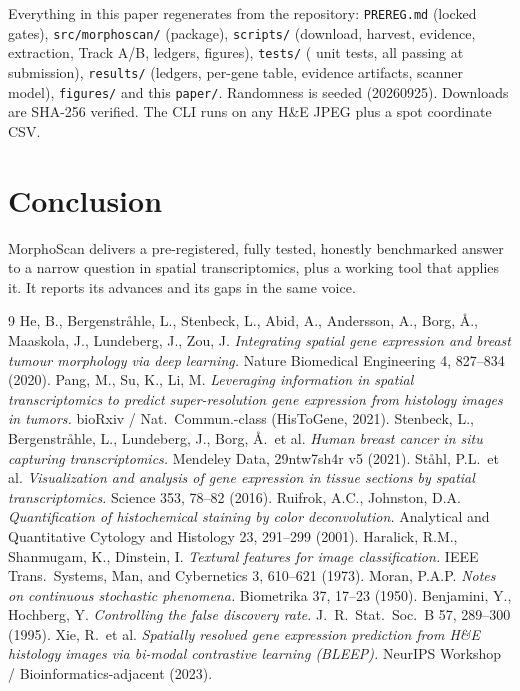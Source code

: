 \documentclass[11pt]{article}
\begin{document}
Everything in this paper regenerates from the repository: \texttt{PREREG.md} (locked
gates), \texttt{src/morphoscan/} (package), \texttt{scripts/} (download, harvest,
evidence, extraction, Track A/B, ledgers, figures), \texttt{tests/} (\numTests{}
unit tests, all passing at submission), \texttt{results/} (ledgers, per-gene table,
evidence artifacts, scanner model), \texttt{figures/} and this \texttt{paper/}.
Randomness is seeded (20260925). Downloads are SHA-256 verified. The CLI runs on any
H\&E JPEG plus a spot coordinate CSV.

\section{Conclusion}
MorphoScan delivers a pre-registered, fully tested, honestly benchmarked answer to a
narrow question in spatial transcriptomics, plus a working tool that applies it. It
reports its advances and its gaps in the same voice.

\begin{thebibliography}{9}\small
{} He, B., Bergenstr\r{a}hle, L., Stenbeck, L., Abid, A., Andersson, A.,
Borg, \AA., Maaskola, J., Lundeberg, J., Zou, J. \emph{Integrating spatial gene
expression and breast tumour morphology via deep learning.} Nature Biomedical
Engineering 4, 827--834 (2020).
 Pang, M., Su, K., Li, M. \emph{Leveraging information in spatial
transcriptomics to predict super-resolution gene expression from histology images in
tumors.} bioRxiv / Nat.\ Commun.-class (HisToGene, 2021).
 Stenbeck, L., Bergenstr\r{a}hle, L., Lundeberg, J., Borg, \AA.\ et al.
\emph{Human breast cancer in situ capturing transcriptomics.} Mendeley Data,
29ntw7sh4r v5 (2021).
 St\r{a}hl, P.L.\ et al. \emph{Visualization and analysis of gene
expression in tissue sections by spatial transcriptomics.} Science 353, 78--82 (2016).
 Ruifrok, A.C., Johnston, D.A. \emph{Quantification of histochemical
staining by color deconvolution.} Analytical and Quantitative Cytology and Histology
23, 291--299 (2001).
 Haralick, R.M., Shanmugam, K., Dinstein, I. \emph{Textural features
for image classification.} IEEE Trans.\ Systems, Man, and Cybernetics 3, 610--621 (1973).
 Moran, P.A.P. \emph{Notes on continuous stochastic phenomena.}
Biometrika 37, 17--23 (1950).
 Benjamini, Y., Hochberg, Y. \emph{Controlling the false discovery rate.}
J.\ R.\ Stat.\ Soc.\ B 57, 289--300 (1995).
 Xie, R.\ et al. \emph{Spatially resolved gene expression prediction
from H\&E histology images via bi-modal contrastive learning (BLEEP).} NeurIPS
Workshop / Bioinformatics-adjacent (2023).
\end{thebibliography}
\end{document}
